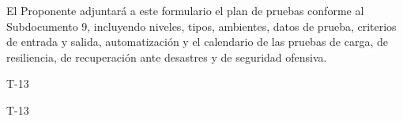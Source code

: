 
  {El Proponente adjuntará a este formulario el plan de pruebas conforme al Subdocumento 9, incluyendo niveles, tipos, ambientes, datos de prueba, criterios de entrada y salida, automatización y el calendario de las pruebas de carga, de resiliencia, de recuperación ante desastres y de seguridad ofensiva.}

\expandafter\def\csname esqueleto@T-13\endcsname{%
  \begin{formulario}{T-13}
    \begin{contenidoExigido}{T-13}
    \end{contenidoExigido}
  \end{formulario}}
